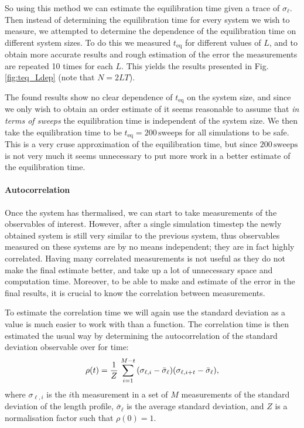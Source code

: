 So using this method we can estimate the equilibration time given a trace of $\sigma_\ell$.
Then instead of determining the equilibration time for every system we wish to measure, we attempted to determine the dependence of the equilibration time on different system sizes.
To do this we measured $t_\text{eq}$ for different values of $L$, and to obtain more accurate results and rough estimation of the error the measurements are repeated 10 times for each $L$.
This yields the results presented in Fig. \ref{fig:teq_Ldep} (note that $N = 2 L T$).

The found results show no clear dependence of $t_\text{eq}$ on the system size, and since we only wish to obtain an order estimate of it seems reasonable to assume that \emph{in terms of sweeps} the equilibration time is independent of the system size.
We then take the equilibration time to be $t_\text{eq} = 200 \, \text{sweeps}$ for all simulations to be safe.
This is a very cruse approximation of the equilibration time, but since $200 \,\text{sweeps}$ is not very much it seems unnecessary to put more work in a better estimate of the equilibration time.

\paragraph{Autocorrelation}
Once the system has thermalised, we can start to take measurements of the observables of interest.
However, after a single simulation timestep the newly obtained system is still very similar to the previous system, thus observables measured on these systems are by no means independent; they are in fact highly correlated.
Having many correlated measurements is not useful as they do not make the final estimate better, and take up a lot of unnecessary space and computation time.
Moreover, to be able to make and estimate of the error in the final results, it is crucial to know the correlation between measurements.

To estimate the correlation time we will again use the standard deviation as a value is much easier to work with than a function.
The correlation time is then estimated the usual way by determining the autocorrelation of the standard deviation observable over for time:
\begin{equation*}
    \rho(t) = \frac{1}{Z} \, \sum_{i = 1}^{M - t} \qty(\sigma_{\ell, i} - \bar{\sigma}_\ell) \qty(\sigma_{\ell, i + t} - \bar{\sigma}_\ell),
\end{equation*}
where $\sigma_{\ell, i}$ is the $i$th measurement in a set of $M$ measurements of the standard deviation of the length profile, $\bar \sigma_\ell$ is the average standard deviation, and $Z$ is a normalisation factor such that $\rho(0) = 1$.

